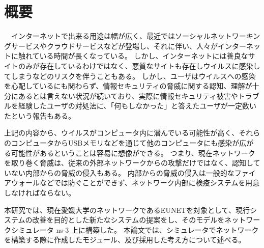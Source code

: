 \chapter*{概要}


　インターネットで出来る用途は幅が広く、最近ではソーシャルネットワーキングサービスやクラウドサービスなどが登場し、それに伴い、人々がインターネットに触れている時間が長くなっている。
しかし、インターネットには善良なサイトのみが存在しているわけではなく、悪質なサイトも存在しウイルスに感染してしまうなどのリスクを伴うこともある。
しかし、ユーザはウイルスへの感染を心配しているにも関わらず、情報セキュリティの脅威に関する認知、理解が十分にあるとは言えない状況が続いており、実際に情報セキュリティ被害やトラブルを経験したユーザの対処法に、「何もしなかった」と答えたユーザが一定数いたという報告もある\cite{joron1}。

上記の内容から、ウイルスがコンピュータ内に潜んでいる可能性が高く、それらのコンピュータからUSBメモリなどを通じて他のコンピュータにも感染が広がる可能性があるということは容易に想像ができる。
つまり、現在ネットワークを取り巻く脅威は、従来の外部ネットワークからの攻撃だけではなく、認知していない内部からの脅威の侵入もある。
内部からの脅威の侵入は一般的なファイアウォールなどでは防ぐことができず、ネットワーク内部に検疫システムを用意しなければならない。

本研究では、現在愛媛大学のネットワークであるEUNETを対象として、現行システムの改善を目的とした新たなシステムの提案をし、そのモデルをネットワークシミュレータ ns-3 上に構築した。
本論文では、シミュレータでネットワークを構築する際に作成したモジュール、及び採用した考え方について述べる。